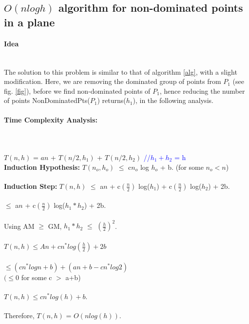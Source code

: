 \documentclass[pdftex,a4paper,12pt]{report}
\begin{document}
\newpage

\subsection {\textbf{$O(n logh)$} algorithm for non-dominated points in a plane}
\paragraph{Idea} \makebox[2pt]{}\\

The solution to this problem is similar to that of algorithm \ref{alg}, with a slight modification.
Here, we are removing the dominated group of points from $P_1$ (see fig. \ref{fig}), before we find non-dominated points of $P_1$,
hence reducing the number of points NonDominatedPts($P_1$) returns($h_1$), in the following analysis. 

\paragraph{Time Complexity Analysis:}\makebox[2pt]{}\\\\
$T(n,h)$ = $an$ + $T(n/2,h_1)$ + $T(n/2,h_2)$ 		\textcolor{blue}{//$h_1+h_2$ = h}\\
\textbf{Induction Hypothesis:} $T(n_o, h_o)$ $\leq$ c$n_o$ log $h_o$ + b. (for some $n_o < n$) \\\\
\textbf{Induction Step:} $T(n, h)$ $\leq$ a$n$ + c$(\frac{n}{2})$ log($h_1$) + c$(\frac{n}{2})$ log($h_2$) + 2b. \\\\
\makebox[100pt]{} $\leq$ a$n$ + c$(\frac{n}{2})$ log($h_1 * h_2$) + 2b.\\\\
Using AM $\geq$ GM, $h_1*h_2$ $\leq$ $(\frac{h}{2})^2$.\\\\
\makebox[80pt]{} $T(n,h) \leq An + cn^*log(\frac{h}{2}) + 2b$ \\\\
\makebox[80pt]{} $\leq(cn^*logn + b) + (an + b - cn^*log2)$\\
\makebox[200pt]{} $(\leq 0$ for some c $>$ a+b)\\\\
\makebox[80pt]{} $T(n,h) \leq cn^*log(h) + b.$\\\\

Therefore, $T(n,h)$ = $O(n log(h))$.
\newpage
\end{document}
